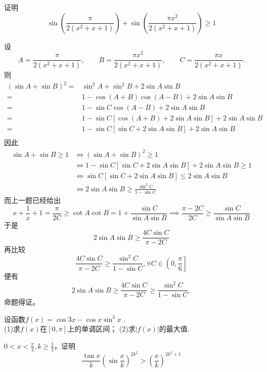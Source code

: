 \newpage
\begin{example}
证明\[\sin\left(\frac{\pi}{2(x^2+x+1)}\right)+\sin\left(\frac{\pi x^2}{2(x^2+x+1)}\right)\geqslant 1\]
\end{example}
\begin{solution}
设
\[
A=\frac{\pi}{2(x^2+x+1)},\qquad B=\frac{\pi x^2}{2(x^2+x+1)},\qquad C=\frac{\pi x}{2(x^2+x+1)}.
\]
则
\begin{align*}
(\sin A+\sin B)^2=&\sin^2A+\sin^2B+2\sin A\sin B\\
=&1-\cos (A+B)\cos (A-B)+2\sin A\sin B\\
=&1-\sin C\cos (A-B)+2\sin A\sin B\\
=&1-\sin C[\cos (A+B)+2\sin A\sin B]+2\sin A\sin B\\
=&1-\sin C[\sin C+2\sin A\sin B]+2\sin A\sin B\\
\end{align*}
因此
\begin{align*}
\sin A+\sin B\geq 1&\Leftrightarrow(\sin A+\sin B)^2\geq1\\
&\Leftrightarrow 1-\sin C[\sin C+2\sin A\sin B]+2\sin A\sin B\geq 1\\
&\Leftrightarrow \sin C[\sin C+2\sin A\sin B]\leq 2\sin A\sin B\\
&\Leftrightarrow 2\sin A \sin B \geqslant \frac{\sin^2 C}{1-\sin C}
\end{align*}
而上一题已经给出
\[x + \frac{1}{x} + 1= \frac{\pi}{2C} \geqslant \cot A \cot B= 1 + \frac{\sin C}{\sin A \sin B}\implies \frac{\pi - 2C}{2C} \geqslant \frac{\sin C}{\sin A \sin B}\]
于是
$$ 2\sin A \sin B \geqslant \frac{4C\sin C}{\pi - 2C} $$
再比较
$$ \frac{4C\sin C}{\pi - 2C} \geqslant \frac{\sin^2 C}{1-\sin C} ,\forall C \in \left(0, \frac{\pi}{6}\right]$$
便有
\[
2\sin A \sin B \geqslant \frac{4C\sin C}{\pi - 2C}\geqslant \frac{\sin^2 C}{1-\sin C},
\]
命题得证。
\end{solution}
\begin{example}
    设函数$f\left ( x\right ) = \cos 3x- \cos x\sin ^3x$ .\\
(1)求$f(x)$在$[0,\pi]$上的单调区间； (2)求$|f(x)|$的最大值.
\end{example}
\begin{solution}

\end{solution}
\begin{example}
$0<x<\frac{\pi}{2},k\geqslant\frac{1}{2}$，证明\[\frac{\tan x}{k}\left(\sin\frac{x}{k}\right)^{2k^2}>\left(\frac{x}{k}\right)^{2k^2+1}\]
\end{example}
